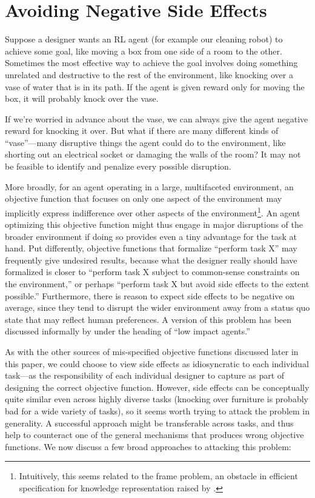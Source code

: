 \documentclass[a4paper,10pt]{article}
\begin{document}
\section{Avoiding Negative Side Effects} \label{problem:SideEffects}
Suppose a designer wants an RL agent (for example our cleaning robot) to achieve some goal, like moving a box from one side of a room to the other.  Sometimes the most effective way to achieve the goal involves doing something unrelated and destructive to the rest of the environment, like knocking over a vase of water that is in its path.  If the agent is given reward only for moving the box, it will probably knock over the vase.

If we’re worried in advance about the vase, we can always give the agent negative reward for knocking it over.  But what if there are many different kinds of ``vase''---many disruptive things the agent could do to the environment, like shorting out an electrical socket or damaging the walls of the room? It may not be feasible to identify and penalize every possible disruption.

More broadly, for an agent operating in a large, multifaceted environment, an objective function that focuses on only one aspect of the environment may implicitly express indifference over other aspects of the environment\footnote{Intuitively, this seems related to the frame problem, an obstacle in efficient specification for knowledge representation raised by \cite{mccarthy1969philosophical}.}.  An agent optimizing this objective function might thus engage in major disruptions of the broader environment if doing so provides even a tiny advantage for the task at hand.  Put differently, objective functions that formalize ``perform task X'' may frequently give undesired results, because what the designer really should have formalized is closer to ``perform task X subject to common-sense constraints on the environment,'' or perhaps ``perform task X but avoid side effects to the extent possible.''  Furthermore, there is reason to expect side effects to be negative on average, since they tend to disrupt the wider environment away from a status quo state that may reflect human preferences.  A version of this problem has been discussed informally by \cite{armstrong2012reduced} under the heading of  ``low impact agents.''

As with the other sources of mis-specified objective functions discussed later in this paper, we could choose to view side effects as idiosyncratic to each individual task---as the responsibility of each individual designer to capture as part of designing the correct objective function.  However, side effects can be conceptually quite similar even across highly diverse tasks (knocking over furniture is probably bad for a wide variety of tasks), so it seems worth trying to attack the problem in generality.  A successful approach might be transferable across tasks, and thus help to counteract one of the general mechanisms that produces wrong objective functions. We now discuss a few broad approaches to attacking this problem:
\end{document}
